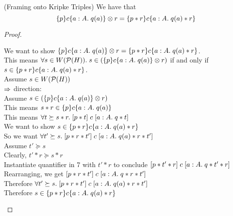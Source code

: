 \begin{lemma}{(Framing onto Kripke Triples)}
We have that 
\begin{displaymath}
\{{p}\}{c}\{{a:A}.\;{q(a)}\} \otimes r = \{{p * r}\}{c}\{{a:A}.\;{q(a) * r}\}  
\end{displaymath}
\end{lemma}

\begin{proof}
\begin{tabbedproof}
\oo We want to show $\{{p}\}{c}\{{a:A}.\;{q(a)}\} \otimes r = \{{p * r}\}{c}\{{a:A}.\;{q(a) * r}\}$. \\
\oo This means $\forall s \in W(\mathcal{P}(H)).\; s \in (\{{p}\}{c}\{{a:A}.\;{q(a)}\} \otimes r)$ if and
only if $s \in \{{p * r}\}{c}\{{a:A}.\;{q(a) * r}\}$. \\
\ooo Assume $s \in W(\mathcal{P}(H))$ \\
\oooo $\Rightarrow$ direction: \\
\ooooo Assume $s \in (\{{p}\}{c}\{{a:A}.\;{q(a)}\} \otimes r)$ \\
\oooooo This means $s * r \in \{{p}\}{c}\{{a:A}.\;{q(a)}\}$ \\
\oooooo This means $\forall t \succeq s * r.\; [{p * t}]\;{c}\;[{a:A}.\;{q * t}]$ \\
\oooooo We want to show $s \in \{{p * r}\}{c}\{{a:A}.\;{q(a) * r}\}$ \\
\oooooo So we want $\forall t' \succeq s.\; [{p * r * t'}]\;{c}\;[{a:A}.\;{q(a) * r * t'}]$\\
\oooooo Assume $t' \succeq s$ \\
\ooooooo Clearly, $t' * r \succeq s * r$ \\
\ooooooo Instantiate quantifier in 7 with $t' * r$ to conclude
         $[{p * t' * r}]\;{c}\;[{a:A}.\;{q * t' * r}]$ \\
\ooooooo Rearranging, we get $[{p * r * t'}]\;{c}\;[{a:A}.\;{q * r * t'}]$ \\
\oooooo Therefore $\forall t' \succeq s.\; [{p * r * t'}]\;{c}\;[{a:A}.\;{q(a) * r * t'}]$\\
\oooooo Therefore $s \in \{{p * r}\}{c}\{{a:A}.\;{q(a) * r}\}$ \\[0.5em]


\end{tabbedproof}
\end{proof}

